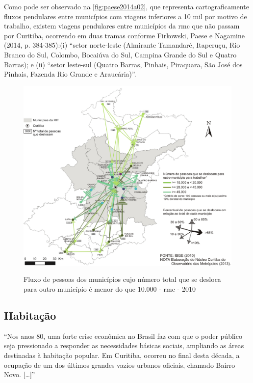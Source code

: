 	Como pode ser observado na \autoref{fig:paese2014a02}, que representa cartograficamente fluxos pendulares entre municípios com viagens inferiores a 10 mil por motivo de trabalho, existem viagens pendulares entre municípios da \gls{rmc} que não passam por Curitiba, ocorrendo em duas tramas conforme Firkowski, Paese e Nagamine (2014, p. 384-385):(i) “setor norte-leste (Almirante Tamandaré, Itaperuçu, Rio Branco do Sul, Colombo, Bocaiúva do Sul, Campina Grande do Sul e Quatro Barras); e (ii) ``setor leste-sul (Quatro Barras, Pinhais, Piraquara, São José dos Pinhais, Fazenda Rio Grande e Araucária)''.

	\begin{figure}
		\centering
		\caption{Fluxo de pessoas dos municípios cujo número total que se desloca para outro município é menor do que 10.000 - \gls{rmc} - 2010}
		\includegraphics[width=0.7\linewidth]{img/paese2014a_02}
		\label{fig:paese2014a02}
	\end{figure}
	
	\subsection{Habitação}
	
	\begin{citacao}
		``Nos anos 80, uma forte crise econômica no Brasil faz com que o poder público seja pressionado a responder as necessidades básicas sociais, ampliando as áreas destinadas à habitação popular. Em Curitiba, ocorreu no final desta década, a ocupação de um dos últimos grandes vazios urbanos oficiais, chamado Bairro Novo. [\dots]'' \cite[p. 54]{castro2005a}
	\end{citacao}
	

